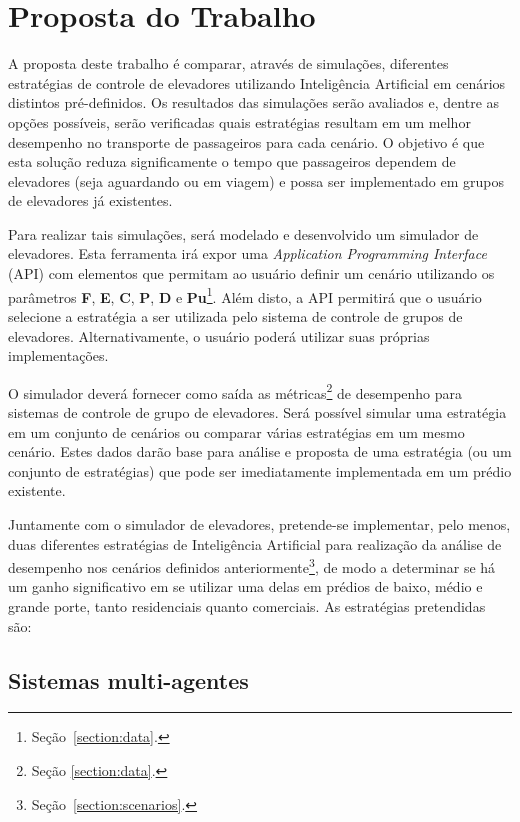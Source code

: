 \chapter{\label{chap:proposal}Proposta do Trabalho}

A proposta deste trabalho é comparar, através de simulações, diferentes
estratégias de controle de elevadores utilizando Inteligência Artificial em
cenários distintos pré-definidos. Os resultados das simulações serão avaliados
e, dentre as opções possíveis, serão verificadas quais estratégias resultam em
um melhor desempenho no transporte de passageiros para cada cenário. O objetivo
é que esta solução reduza significamente o tempo que passageiros dependem de
elevadores (seja aguardando ou em viagem) e possa ser implementado em grupos de
elevadores já existentes.

Para realizar tais simulações, será modelado e desenvolvido um simulador de
elevadores. Esta ferramenta irá expor uma \textit{Application Programming
Interface} (API) com elementos que permitam ao usuário definir um cenário
utilizando os parâmetros \textbf{F}, \textbf{E}, \textbf{C}, \textbf{P},
\textbf{D} e \textbf{Pu}\footnote{Seção~\ref{section:data}.}. Além disto, a API
permitirá que o usuário selecione a estratégia a ser utilizada pelo sistema de
controle de grupos de elevadores. Alternativamente, o usuário poderá utilizar
suas próprias implementações.

O simulador deverá fornecer como saída as métricas\footnote{Seção
\ref{section:data}.} de desempenho para sistemas de controle de grupo de
elevadores. Será possível simular uma estratégia em um conjunto de cenários ou
comparar várias estratégias em um mesmo cenário. Estes dados darão base para
análise e proposta de uma estratégia (ou um conjunto de estratégias) que pode
ser imediatamente implementada em um prédio existente.

Juntamente com o simulador de elevadores, pretende-se implementar, pelo menos,
duas diferentes estratégias de Inteligência Artificial para realização da
análise de desempenho nos cenários definidos
anteriormente\footnote{Seção~\ref{section:scenarios}.}, de modo a determinar se
há um ganho significativo em se utilizar uma delas em prédios de baixo, médio e
grande porte, tanto residenciais quanto comerciais. As estratégias pretendidas
são:

\section{\label{section:multiagentes}Sistemas multi-agentes}

